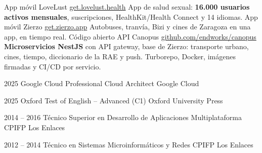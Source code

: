 \documentclass[9pt]{developercv} %
\begin{document}


\begin{entrylist}
	\entry
		{App móvil}
		{LoveLust}
		{\href{https://get.lovelust.health}{get.lovelust.health}}
		{App de salud sexual: \textbf{16.000 usuarios activos mensuales}, suscripciones, HealthKit/Health Connect y 14 idiomas.}
	\entry
		{App móvil}
		{Zierzo}
		{\href{https://get.zierzo.app}{get.zierzo.app}}
		{Autobuses, tranvía, Bizi y cines de Zaragoza en una app, en tiempo real.}
	\entry
		{Código abierto}
		{API Canopus}
		{\href{https://github.com/endworks/canopus}{github.com/endworks/canopus}}
		{\textbf{Microservicios NestJS} con API gateway, base de Zierzo: transporte urbano, cines, tiempo, diccionario de la RAE y push. Turborepo, Docker, imágenes firmadas y CI/CD por servicio.}
\end{entrylist}


%

\begin{entrylist}
	\shortentry
		{2025}
		{Google Cloud Professional Cloud Architect}
		{Google Cloud}
		{}

	\shortentry
		{2025}
		{Oxford Test of English -- Advanced (C1)}
		{Oxford University Press}
		{}
\end{entrylist}



\begin{entrylist}
	\shortentry
		{2014 -- 2016}
		{Técnico Superior en Desarrollo de Aplicaciones Multiplataforma}
		{CPIFP Los Enlaces}
		{}

	\shortentry
		{2012 -- 2014}
		{Técnico en Sistemas Microinformáticos y Redes}
		{CPIFP Los Enlaces}
		{}
\end{entrylist}
\end{document}
